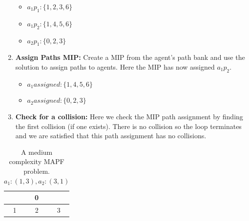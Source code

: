 \documentclass[a4paper,11pt]{article}
\begin{document}
\begin{enumerate}
\begin{itemize}
		\item $a_1p_1: \{1, 2, 3, 6\}$
		\item $a_1p_2: \{1, 4, 5, 6\}$
		\item $a_2p_1: \{0, 2, 3\}$
	\end{itemize}
	\item \textbf{Assign Paths MIP:} Create a MIP from the agent's path bank and use the solution to assign paths to agents. Here the MIP has now assigned $a_1p_2$.
	\begin{itemize}
		\item $a_1assigned: \{1, 4, 5, 6\}$
		\item $a_2assigned: \{0, 2, 3\}$
	\end{itemize}
	\item \textbf{Check for a collision:} Here we check the MIP path assignment by finding the first collision (if one exists). There is no collision so the loop terminates and we are satisfied that this path assignment has no collisions.
\end{enumerate}

\begin{table}[h]
	\centering
	\footnotesize
	\begin{tabular}{|c|c|c|}
		\hline
		\cellcolor{black} & 0 & \cellcolor{black} \\ \hline
		1 & 2 & 3 \\ \hline
	\end{tabular}
	
	\caption{A medium complexity MAPF problem. $a_1: (1, 3), a_2: (3, 1)$}
	\label{fig:complex-step-through-example}
\end{table}
\end{document}
